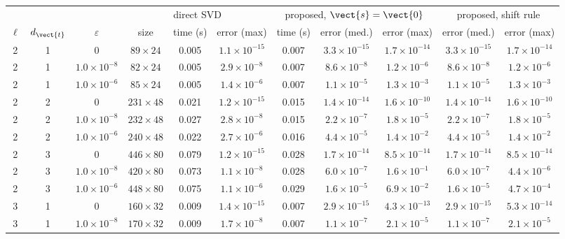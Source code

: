 \begin{tabular}{ccc|ccc|ccc|cc}\hline
&&& \multicolumn{3}{c|}{direct SVD} & \multicolumn{3}{c|}{proposed, $\vect{s}=\vect{0}$} & \multicolumn{2}{c}{proposed, shift rule}\\
$\ell$ & $d_{\vect{t}}$ & $\varepsilon$ & size & time (s) & error (max) & time (s) & error (med.) & error (max) & error (med.) & error (max)\\ \hline
2 & 1 & $0$ & $89\times 24$ & 0.005 & $1.1\times 10^{-15}$ & 0.007 & $3.3\times 10^{-15}$ & $1.7\times 10^{-14}$ & $3.3\times 10^{-15}$ & $1.7\times 10^{-14}$\\
2 & 1 & $1.0\times 10^{-8}$ & $82\times 24$ & 0.005 & $2.9\times 10^{-8}$ & 0.007 & $8.6\times 10^{-8}$ & $1.2\times 10^{-6}$ & $8.6\times 10^{-8}$ & $1.2\times 10^{-6}$\\
2 & 1 & $1.0\times 10^{-6}$ & $85\times 24$ & 0.005 & $1.4\times 10^{-6}$ & 0.007 & $1.1\times 10^{-5}$ & $1.3\times 10^{-3}$ & $1.1\times 10^{-5}$ & $1.3\times 10^{-3}$\\
2 & 2 & $0$ & $231\times 48$ & 0.021 & $1.2\times 10^{-15}$ & 0.015 & $1.4\times 10^{-14}$ & $1.6\times 10^{-10}$ & $1.4\times 10^{-14}$ & $1.6\times 10^{-10}$\\
2 & 2 & $1.0\times 10^{-8}$ & $232\times 48$ & 0.027 & $2.8\times 10^{-8}$ & 0.015 & $2.2\times 10^{-7}$ & $1.8\times 10^{-5}$ & $2.2\times 10^{-7}$ & $1.8\times 10^{-5}$\\
2 & 2 & $1.0\times 10^{-6}$ & $240\times 48$ & 0.022 & $2.7\times 10^{-6}$ & 0.016 & $4.4\times 10^{-5}$ & $1.4\times 10^{-2}$ & $4.4\times 10^{-5}$ & $1.4\times 10^{-2}$\\
2 & 3 & $0$ & $446\times 80$ & 0.079 & $1.2\times 10^{-15}$ & 0.028 & $1.7\times 10^{-14}$ & $8.5\times 10^{-14}$ & $1.7\times 10^{-14}$ & $8.5\times 10^{-14}$\\
2 & 3 & $1.0\times 10^{-8}$ & $420\times 80$ & 0.073 & $1.1\times 10^{-8}$ & 0.028 & $6.0\times 10^{-7}$ & $1.6\times 10^{-1}$ & $6.0\times 10^{-7}$ & $4.4\times 10^{-6}$\\
2 & 3 & $1.0\times 10^{-6}$ & $448\times 80$ & 0.075 & $1.1\times 10^{-6}$ & 0.029 & $1.6\times 10^{-5}$ & $6.9\times 10^{-2}$ & $1.6\times 10^{-5}$ & $4.7\times 10^{-4}$\\
3 & 1 & $0$ & $160\times 32$ & 0.009 & $1.4\times 10^{-15}$ & 0.007 & $2.9\times 10^{-15}$ & $4.3\times 10^{-13}$ & $2.9\times 10^{-15}$ & $5.3\times 10^{-14}$\\
3 & 1 & $1.0\times 10^{-8}$ & $170\times 32$ & 0.009 & $1.7\times 10^{-8}$ & 0.007 & $1.1\times 10^{-7}$ & $2.1\times 10^{-5}$ & $1.1\times 10^{-7}$ & $2.1\times 10^{-5}$\\

\end{tabular}
